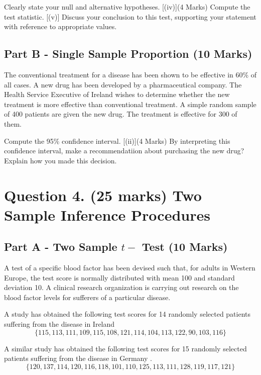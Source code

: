 \begin{itemize}
[(iii)] Clearly state your null and alternative hypotheses.
[(iv)](4 Marks) Compute the test statistic.
[(v)] Discuss your conclusion to this test, supporting your statement with reference to appropriate values.
\end{itemize}


\newpage

\subsection*{Part B - Single Sample Proportion (10 Marks)}

The conventional treatment for a disease has been shown to be effective in 60\% of all 
cases. A new drug has been developed by a pharmaceutical company. The Health Service Executive of Ireland
wishes to determine whether the new treatment is more effective than conventional treatment. 
A simple random sample of 400 patients are given the new drug. The treatment is effective for 300 of them.


\begin{itemize}
[(i)] Compute the 95\% confidence interval.
[(ii)](4 Marks) By interpreting this confidence interval, make a recommendatiion about purchasing the new drug? Explain how you made this decision.
\end{itemize}




\section*{Question 4. (25 marks) Two Sample Inference Procedures}

\subsection*{Part A - Two Sample $t-$ Test (10 Marks)}
A test of a specific blood factor has been devised such that, for adults in Western Europe, the test score is normally distributed with mean 100 and standard deviation 10. A clinical research organization is carrying out research on the blood factor levels for sufferers of a particular disease.  

\begin{itemize}
 A study has obtained the following test scores for 14 randomly selected patients suffering from the disease in Ireland 
	\[ \{115, 113, 111, 109, 115, 108, 121, 114, 104, 113, 122, 90, 
	103, 116\}\]
	
 A similar study has obtained the following test scores for 15 randomly selected patients suffering from the disease in Germany .
	\[\{120, 137, 114, 120, 116, 118, 101, 110, 125, 113, 111, 128, 
	119, 117, 121\}\]
	
	\end{itemize}
	

